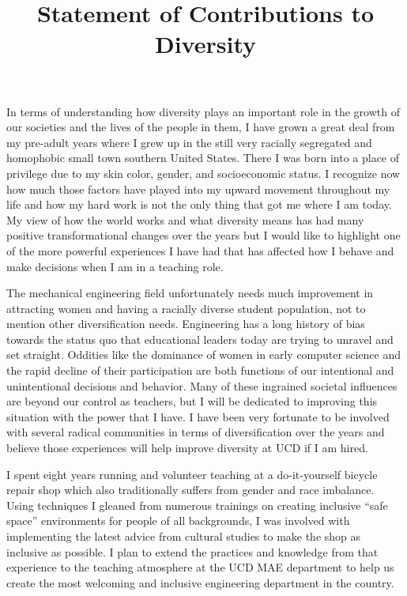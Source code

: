 \documentclass{article}
\title{Statement of Contributions to Diversity}
\date{}
\begin{document}
\maketitle

In terms of understanding how diversity plays an important role in the growth
of our societies and the lives of the people in them, I have grown a great deal
from my pre-adult years where I grew up in the still very racially segregated
and homophobic small town southern United States. There I was born into a place
of privilege due to my skin color, gender, and socioeconomic status. I
recognize now how much those factors have played into my upward movement
throughout my life and how my hard work is not the only thing that got me where
I am today. My view of how the world works and what diversity means has had
many positive transformational changes over the years but I would like to
highlight one of the more powerful experiences I have had that has affected how
I behave and make decisions when I am in a teaching role.

The mechanical engineering field unfortunately needs much improvement in
attracting women and having a racially diverse student population, not to
mention other diversification needs. Engineering has a long history of bias
towards the status quo that educational leaders today are trying to unravel and
set straight. Oddities like the dominance of women in early computer science
and the rapid decline of their participation are both functions of our
intentional and unintentional decisions and behavior. Many of these ingrained
societal influences are beyond our control as teachers, but I will be dedicated
to improving this situation with the power that I have. I have been very
fortunate to be involved with several radical communities in terms of
diversification over the years and believe those experiences will help improve
diversity at UCD if I am hired.

I spent eight years running and volunteer teaching at a do-it-yourself bicycle
repair shop which also traditionally suffers from gender and race imbalance.
Using techniques I gleaned from numerous trainings on creating inclusive ``safe
space'' environments for people of all backgrounds, I was involved with
implementing the latest advice from cultural studies to make the shop as
inclusive as possible. I plan to extend the practices and knowledge from that
experience to the teaching atmosphere at the UCD MAE department to help us
create the most welcoming and inclusive engineering department in the country.
\end{document}
